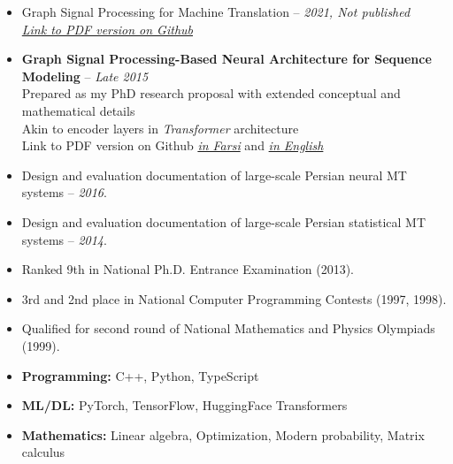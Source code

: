 \documentclass[11pt, a4paper]{awesome-cv}
\begin{document}
\begin{itemize}
  \item {Graph Signal Processing for Machine Translation} -- \textit{2021, Not published}\\
        \href{https://github.com/vedadian/gra_sp_nmt_paper/blob/main/build/paper1.pdf}{\textit{Link to PDF version on Github}}
  \item \textbf{Graph Signal Processing-Based Neural Architecture for Sequence Modeling} -- \textit{Late 2015}\\
        Prepared as my PhD research proposal with extended conceptual and mathematical details\\
        Akin to encoder layers in \textit{Transformer} architecture\\
        Link to PDF version on Github \href{https://github.com/vedadian/phd_proposal_2015/blob/main/report.pdf}{\textit{in Farsi}} and \href{https://github.com/vedadian/phd_proposal_2015/blob/main/report_en.pdf}{\textit{in English}}
  \item Design and evaluation documentation of large-scale Persian neural MT systems --
        \textit{2016}.
  \item Design and evaluation documentation of large-scale Persian statistical MT
        systems -- \textit{2014}.
\end{itemize}


\begin{itemize}
  \item Ranked 9th in National Ph.D. Entrance Examination (2013).
  \item 3rd and 2nd place in National Computer Programming Contests (1997, 1998).
  \item Qualified for second round of National Mathematics and Physics Olympiads
        (1999).
\end{itemize}


\begin{itemize}
  \item \textbf{Programming:} C++, Python, TypeScript
  \item \textbf{ML/DL:} PyTorch, TensorFlow, HuggingFace Transformers
  \item \textbf{Mathematics:} Linear algebra, Optimization, Modern probability, Matrix calculus
\end{itemize}
\end{document}
